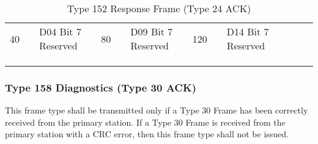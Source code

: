 \documentclass[]{article}
\begin{document}
\begin{landscape}
\begin{table}[]
\begin{tabular}{lllllllllllllll}
			40           &                    & D04 Bit 7 Reserved            &                   & 80           &                     & D09 Bit 7 Reserved   &  & 120          &                     & D14 Bit 7 Reserved   &  &                   &                     &                      \\ \cline{1-3} \cline{5-7} \cline{9-11}
			&                    &                               &                   &              &                     &                      &  &              &                     &                      &  &                   &                     &                      \\
			&                    &                               &                   &              &                     &                      &  &              &                     &                      &  &                   &                     &                      \\
			&                    &                               &                   &              &                     &                      &  &              &                     &                      &  &                   &                     &                     
		\end{tabular}
		\caption{Type 152 Response Frame (Type 24 ACK)}
		\label{tab:type-152-frame}
	\end{table}
\end{landscape}

\subsubsection{Type 158 Diagnostics (Type 30 ACK)}
This frame type shall be transmitted only if a Type 30 Frame has been correctly received from the primary station. If a Type 30 Frame is received from the primary station with a CRC error, then this frame type shall not be issued.
\end{document}
